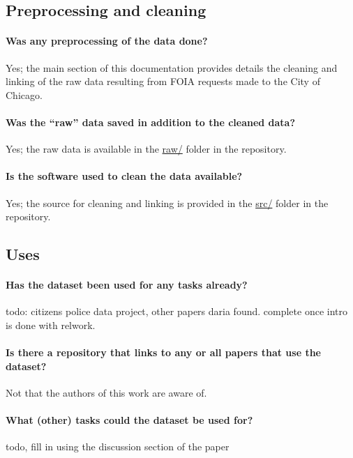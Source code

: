 \subsection{Preprocessing and cleaning}

\paragraph{Was any preprocessing of the data done?}
Yes; the main section of this documentation provides details the cleaning and linking of the raw
data resulting from FOIA requests made to the City of Chicago.

\paragraph{Was the ``raw'' data saved in addition to the cleaned data?}
Yes; the raw data is available in the \url{raw/} folder in the repository.

\paragraph{Is the software used to clean the data available?}
Yes; the source for cleaning and linking is provided in the \url{src/} folder in the repository.

\subsection{Uses}

\paragraph{Has the dataset been used for any tasks already?}
{\color{red} todo: citizens police data project, other papers daria found. complete once intro is done with relwork.}

\paragraph{Is there a repository that links to any or all papers that use the dataset?}
Not that the authors of this work are aware of.

\paragraph{What (other) tasks could the dataset be used for?}
{\color{red} todo, fill in using the discussion section of the paper}

